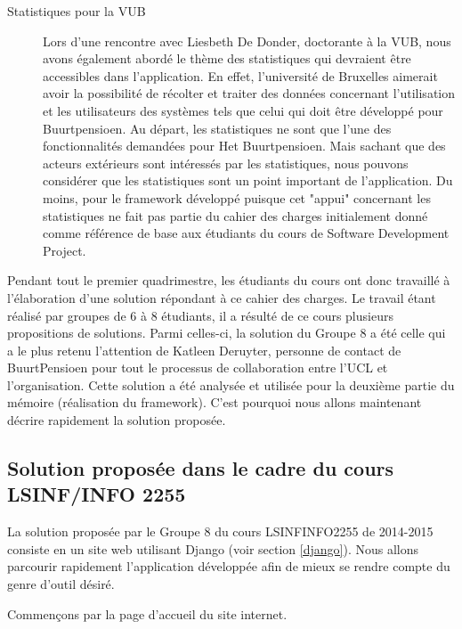 \begin{description}
\item [Statistiques pour la VUB]
Lors d'une rencontre avec Liesbeth De Donder,  doctorante à la VUB,  nous avons également abordé le thème des statistiques qui devraient être accessibles dans l'application.  En effet,  l'université de Bruxelles aimerait avoir la possibilité de récolter et traiter des données concernant l'utilisation et les utilisateurs des systèmes tels que celui qui doit être développé pour Buurtpensioen.  Au départ,  les statistiques ne sont que l'une des fonctionnalités demandées pour Het Buurtpensioen.  Mais sachant que des acteurs extérieurs sont intéressés par les statistiques,  nous pouvons considérer que les statistiques sont un point important de l'application.  Du moins,  pour le framework développé puisque cet "appui" concernant les statistiques ne fait pas partie du cahier des charges initialement donné comme référence de base aux étudiants du cours de Software Development Project.   

\end{description}

Pendant tout le premier quadrimestre,  les étudiants du cours ont donc travaillé à l'élaboration d'une solution répondant à ce cahier des charges.  Le travail étant réalisé par groupes de 6 à 8 étudiants,  il a résulté de ce cours plusieurs propositions de solutions.  Parmi celles-ci,  la solution du Groupe 8 a été celle qui a le plus retenu l'attention de Katleen Deruyter,  personne de contact de BuurtPensioen pour tout le processus de collaboration entre l'UCL et l'organisation.  Cette solution a été analysée et utilisée pour la deuxième partie du mémoire (réalisation du framework).  C'est pourquoi nous allons maintenant décrire rapidement la solution proposée.


\subsection{Solution proposée dans le cadre du cours LSINF/INFO 2255}

La solution proposée par le Groupe 8 du cours LSINFINFO2255 de 2014-2015 consiste en un site web utilisant Django (voir section \ref{django}).  Nous allons parcourir rapidement l'application développée afin de mieux se rendre compte du genre d'outil désiré.

Commençons par la page d'accueil du site internet.  

\vspace{0.5cm}
\vspace{0.5cm}

